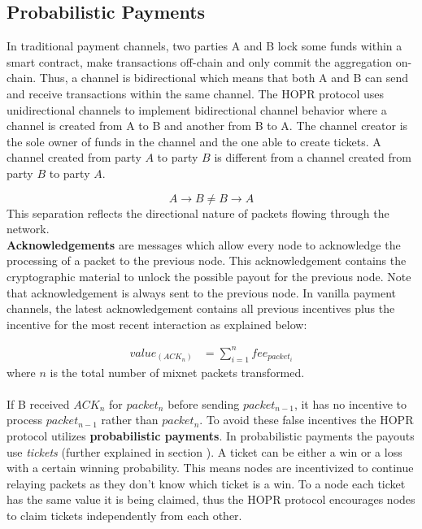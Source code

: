 \subsection{Probabilistic Payments}

In traditional payment channels, two parties A and B lock some funds within a
smart contract, make transactions off-chain and only commit the aggregation
on-chain. Thus, a channel is bidirectional which means that both A and B can
send and receive transactions within the same channel. The HOPR protocol uses
unidirectional channels to implement bidirectional channel behavior where a channel is created from A to B and another from B to A. 
The channel creator is the sole owner of funds in the channel and the one able to create tickets. A channel created from
party $A$ to party $B$ is different from a channel created from party $B$ to
party $A$.

 $$A\rightarrow B \neq B\rightarrow A$$
This separation reflects the directional nature of packets flowing through the
network.
\\\textbf{Acknowledgements} are messages which allow every node to acknowledge the
processing of a packet to the previous node. This acknowledgement contains the
cryptographic material to unlock the possible payout for the previous node. Note
that acknowledgement is always sent to the previous node. In vanilla payment channels, the latest acknowledgement contains all previous incentives plus the incentive for the most recent interaction as explained below:

\begin{align}
value_(ACK_n) &=\sum_{i=1}^nfee_{packet_i}
\end{align}
where $n$ is the total number of mixnet packets transformed.
\\~\\If B received $ACK_n$ for $packet_n$ before sending $packet_{n-1}$, it has no
incentive to process $packet_{n-1}$ rather than $packet_{n}$. To avoid these
false incentives the HOPR protocol utilizes \textbf{probabilistic payments}.
In probabilistic payments the payouts use \textit{tickets} (further explained in
section ). A ticket can be either a win or a loss with a
certain winning probability. This means nodes are incentivized to continue
relaying packets as they don’t know which ticket is a win. To a node each
ticket has the same value it is being claimed, thus the HOPR protocol
encourages nodes to claim tickets independently from each other.

